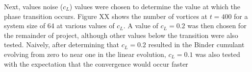 Next, values noise ($c_L$) values were chosen to determine the value at which the phase transition occurs. Figure XX shows the number of vortices at $t=400$ for a system size of 64 at various values of $c_L$. A value of $c_L = 0.2$ was then chosen for the remainder of project, although other values below the transition were also tested. Naively, after determining that $c_L=0.2$ resulted in the Binder cumulant evolving from zero to near one in the linear evolution, $c_L=0.1$ was also tested with the expectation that the convergence would occur faster  
